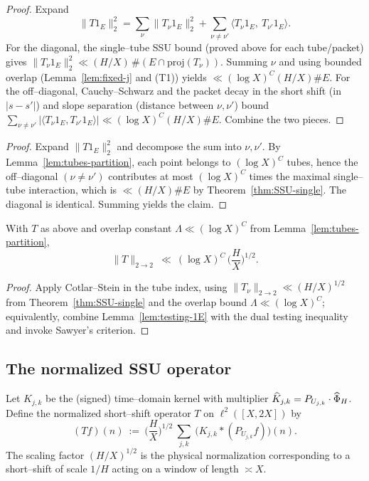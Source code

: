 \begin{proof}
Expand
\[
\|T1_E\|_2^2=\sum_{\nu}\|T_\nu 1_E\|_2^2+\sum_{\nu\ne\nu'}\langle T_\nu 1_E,\ T_{\nu'}1_E\rangle.
\]
For the diagonal, the single–tube SSU bound (proved above for each tube/packet) gives
\(
\|T_\nu 1_E\|_2^2\ll (H/X)\,\#(E\cap \mathrm{proj}(T_\nu)).
\)
Summing $\nu$ and using bounded overlap (Lemma~\ref{lem:fixed-j} and (T1)) yields $\ll (\log X)^C(H/X)\#E$.
For the off–diagonal, Cauchy–Schwarz and the packet decay in the short shift (in $|s-s'|$) and slope separation (distance between $\nu,\nu'$)
bound
\(
\sum_{\nu\ne\nu'}|\langle T_\nu 1_E,T_{\nu'}1_E\rangle|
\ll (\log X)^C(H/X)\#E.
\)
Combine the two pieces.
\end{proof}

\begin{proof}
Expand $\|T1_E\|_2^2$ and decompose the sum into $\nu,\nu'$. By Lemma~\ref{lem:tubes-partition}, each point belongs to $(\log X)^C$ tubes, hence the off–diagonal $(\nu\ne \nu')$ contributes at most $(\log X)^C$ times the maximal single–tube interaction, which is $\ll (H/X)\#E$ by Theorem~\ref{thm:SSU-single}. The diagonal is identical. Summing yields the claim.
\end{proof}

\begin{proposition}\label{prop:SSU-sawyer}
With $T$ as above and overlap constant $\Lambda\ll(\log X)^C$ from Lemma~\ref{lem:tubes-partition},
\[
\|T\|_{2\to2}\ \ll\ (\log X)^C\,\Big(\frac{H}{X}\Big)^{1/2}.
\]
\end{proposition}

\begin{proof}
Apply Cotlar–Stein in the tube index, using $\|T_\nu\|_{2\to2}\ll (H/X)^{1/2}$ from Theorem~\ref{thm:SSU-single} and the overlap bound $\Lambda\ll(\log X)^C$; equivalently, combine Lemma~\ref{lem:testing-1E} with the dual testing inequality and invoke Sawyer’s criterion.
\end{proof}

\subsection{The normalized SSU operator}
Let $K_{j,k}$ be the (signed) time–domain kernel with multiplier $\widehat K_{j,k}=P_{U_{j,k}}\cdot \widehat\Phi_H$.
Define the normalized short–shift operator $T$ on $\ell^2([X,2X])$ by
\begin{equation}\label{eq:def-T}
(Tf)(n)\ :=\ \Big(\frac{H}{X}\Big)^{\!1/2}\ \sum_{j,k}\ \big(K_{j,k}\ast (P_{U_{j,k}}f)\big)(n).
\end{equation}
The scaling factor $(H/X)^{1/2}$ is the physical normalization corresponding to a short–shift of scale $1/H$
acting on a window of length $\asymp X$.

